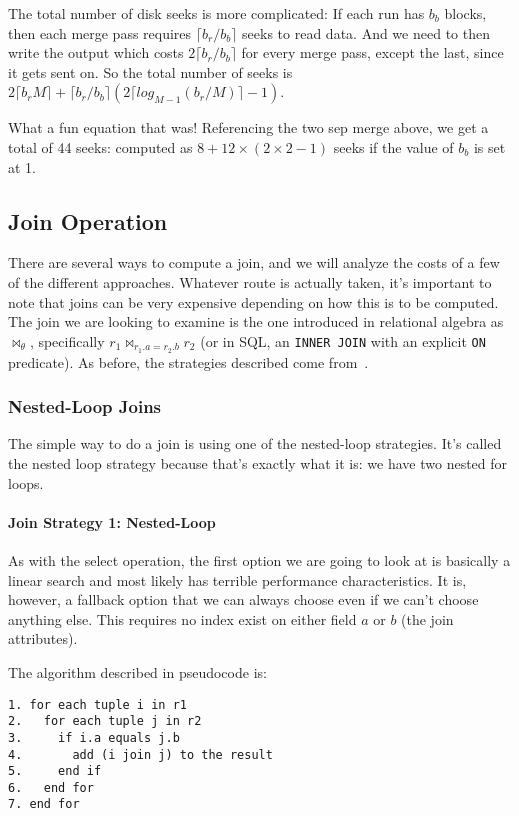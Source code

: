 The total number of disk seeks is more complicated: If each run has $b_{b}$ blocks, then each merge pass requires $\lceil b_{r}/b_{b}\rceil$ seeks to read data. And we need to then write the output which costs  $2\lceil b_{r}/b_{b}\rceil$ for every merge pass, except the last, since it gets sent on. So the total number of seeks is $2\lceil b_{r}M\rceil + \lceil b_{r}/b_{b}\rceil(2 \lceil log_{M-1}(b_{r}/M)\rceil - 1)$.

What a fun equation that was! Referencing the two sep merge above, we get a total of 44 seeks: computed as $8 + 12 \times (2 \times 2 - 1)$ seeks if the value of $b_{b}$ is set at 1.

\subsection*{Join Operation}

There are several ways to compute a join, and we will analyze the costs of a few of the different approaches. Whatever route is actually taken, it's important to note that joins can be very expensive depending on how this is to be computed. The join we are looking to examine is the one introduced in relational algebra as $\Join_{\theta}$, specifically $r_{1} \Join_{r_{1}.a = r_{2}.b} r_{2}$ (or in SQL, an \texttt{INNER JOIN} with an explicit \texttt{ON} predicate). As before, the strategies described come from~\cite{dsc}.

\subsubsection*{Nested-Loop Joins}

The simple way to do a join is using one of the nested-loop strategies. It's called the nested loop strategy because that's exactly what it is: we have two nested for loops.

\paragraph{Join Strategy 1: Nested-Loop}
As with the select operation, the first option we are going to look at is basically a linear search and most likely has terrible performance characteristics. It is, however, a fallback option that we can always choose even if we can't choose anything else. This requires no index exist on either field $a$ or $b$ (the join attributes).

The algorithm described in pseudocode is:
\begin{verbatim}
1. for each tuple i in r1
2.   for each tuple j in r2
3.     if i.a equals j.b
4.       add (i join j) to the result
5.     end if
6.   end for
7. end for
\end{verbatim}

